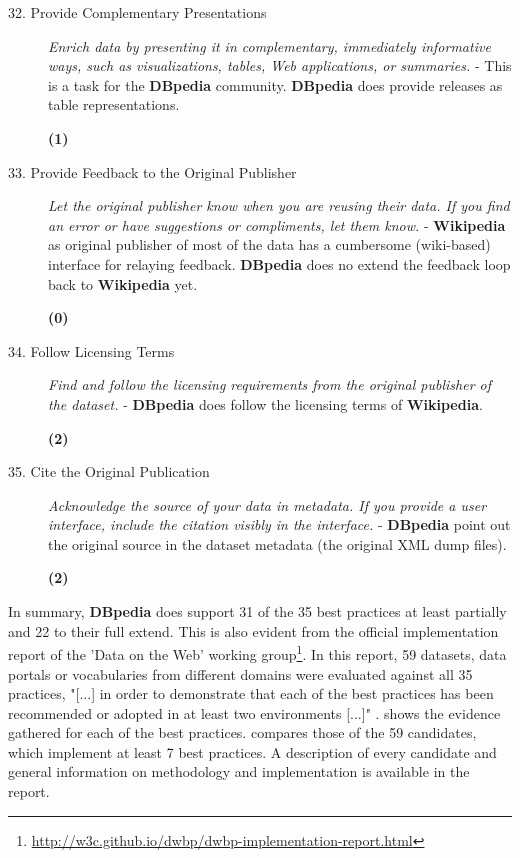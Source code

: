 \documentclass[a4paper,english,twoside,BCOR1.5cm,headsepline,DIV12,appendixprefix,final,12pt]{scrbook}
\newcommand{\dbpedia}{{\ttfamily\bfseries DBpedia}\xspace}
\newcommand{\wikipedia}{{\ttfamily\bfseries Wikipedia}\xspace}
\newcommand\footnoteurl[1]{\footnote{\scriptsize\url{#1}}}
\begin{document}
\begin{description}
 \item[32. Provide Complementary Presentations] \textit{Enrich data by presenting it in complementary, immediately informative ways, such as visualizations, tables, Web applications, or summaries.} - This is a task for the \dbpedia community. \dbpedia does provide releases as table representations.
\begin{flushright}\color{BurntOrange}\textbf{(1)}\end{flushright}
 \item[33. Provide Feedback to the Original Publisher] \textit{Let the original publisher know when you are reusing their data. If you find an error or have suggestions or compliments, let them know.} - \wikipedia as original publisher of most of the data has a cumbersome (wiki-based) interface for relaying feedback. \dbpedia does no extend the feedback loop back to \wikipedia yet.
\begin{flushright}\color{Mahogany}\textbf{(0)}\end{flushright}
 \item[34. Follow Licensing Terms] \textit{Find and follow the licensing requirements from the original publisher of the dataset.} - \dbpedia does follow the licensing terms of \wikipedia.
\begin{flushright}\color{ForestGreen}\textbf{(2)}\end{flushright}
 \item[35. Cite the Original Publication] \textit{Acknowledge the source of your data in metadata. If you provide a user interface, include the citation visibly in the interface.} - \dbpedia point out the original source in the dataset metadata (the original XML dump files).
\begin{flushright}\color{ForestGreen}\textbf{(2)}\end{flushright}
\end{description}

In summary, \dbpedia does support 31 of the 35 best practices at least partially and 22 to their full extend. This is also evident from the official implementation report of the 'Data on the Web' working group\footnoteurl{http://w3c.github.io/dwbp/dwbp-implementation-report.html}. In this report, 59 datasets, data portals or vocabularies from different domains were evaluated against all 35 practices, "[...] in order to demonstrate that each of the best practices has been recommended or adopted in at least two environments [...]" \cite{}.
 shows the evidence gathered for each of the best practices.  compares those of the 59 candidates, which implement at least 7 best practices. A description of every candidate and general information on methodology and implementation is available in the report.
\end{document}
